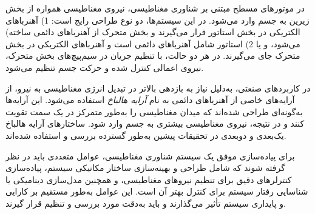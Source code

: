 در موتورهای مسطح مبتنی‌ بر شناوری مغناطیسی، نیروی مغناطیسی همواره از بخش زیرین به جسم وارد می‌شود. در این سیستم‌ها، دو نوع طراحی رایج است: 1) آهنرباهای الکتریکی در بخش استاتور قرار می‌گیرند و بخش متحرک از آهنرباهای دائمی ساخته) می‌شود، و یا 2) استاتور شامل آهنرباهای دائمی است و آهنرباهای الکتریکی در بخش متحرک جای می‌گیرند. در هر دو حالت، با تنظیم جریان در سیم‌پیچ‌های بخش متحرک، نیروی اعمالی کنترل شده و حرکت جسم تنظیم می‌شود.

در کاربردهای صنعتی، به‌دلیل نیاز به بازدهی بالاتر در تبدیل انرژی مغناطیسی به نیرو، از آرایه‌های خاصی از آهنرباهای دائمی به نام 
\textit{آرایه هالباخ}
استفاده می‌شود. این آرایه‌ها به‌گونه‌ای طراحی شده‌اند که میدان مغناطیسی را به‌طور متمرکز در یک سمت تقویت کنند و در نتیجه، نیروی مغناطیسی بیشتری به جسم وارد شود. ساختارهای آرایه هالباخ یک‌بعدی و دوبعدی در تحقیقات پیشین به‌طور گسترده بررسی و استفاده شده‌اند.

برای پیاده‌سازی موفق یک سیستم شناوری مغناطیسی، عوامل متعددی باید در نظر گرفته شوند که شامل طراحی و بهینه‌سازی ساختار مکانیکی سیستم، پیاده‌سازی کنترلرهای دقیق برای تنظیم نیروهای مغناطیسی، و همچنین مدل‌سازی دینامیکی یا شناسایی رفتار سیستم برای کنترل بهتر آن است. این عوامل به‌طور مستقیم بر کارایی و پایداری سیستم تأثیر می‌گذارند و باید به‌دقت مورد بررسی و تنظیم قرار گیرند.

